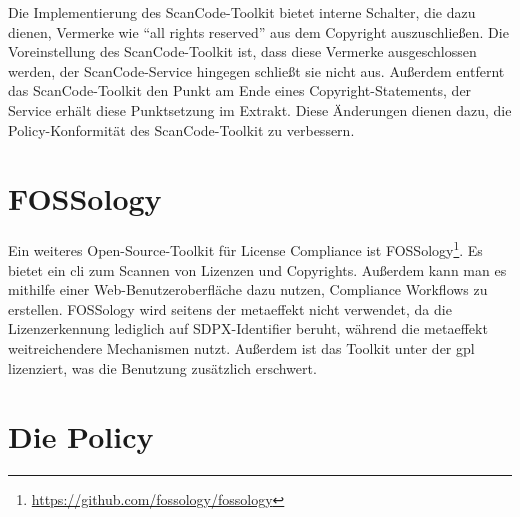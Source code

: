 Die Implementierung des ScanCode-Toolkit bietet interne Schalter, die dazu dienen, Vermerke wie \enquote{all rights reserved} aus dem Copyright auszuschließen.
Die Voreinstellung des ScanCode-Toolkit ist, dass diese Vermerke ausgeschlossen werden, der ScanCode-Service hingegen schließt sie nicht aus.
Außerdem entfernt das ScanCode-Toolkit den Punkt am Ende eines Copyright-Statements, der Service erhält diese Punktsetzung im Extrakt.
Diese Änderungen dienen dazu, die Policy-Konformität des ScanCode-Toolkit zu verbessern\autocite{noauthor_metaeffekt-scancode-service_2025}.


\section{FOSSology}\label{sec:fossology}

Ein weiteres Open-Source-Toolkit für License Compliance ist FOSSology\footnote{\url{https://github.com/fossology/fossology}}.
Es bietet ein \gls{cli} zum Scannen von Lizenzen und Copyrights.
Außerdem kann man es mithilfe einer Web-Benutzeroberfläche dazu nutzen, Compliance Workflows zu erstellen.
FOSSology wird seitens der metaeffekt nicht verwendet, da die Lizenzerkennung lediglich auf SDPX-Identifier beruht, während die metaeffekt weitreichendere Mechanismen nutzt.
Außerdem ist das Toolkit unter der \gls{gpl} lizenziert, was die Benutzung zusätzlich erschwert.


\section{Die Policy}\label{sec:policy}

